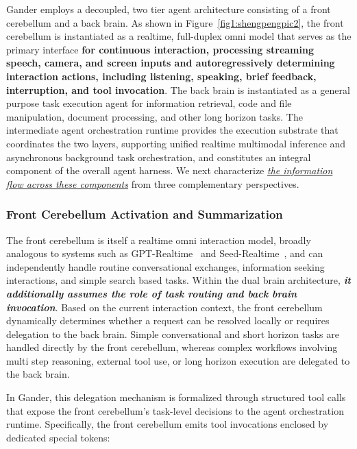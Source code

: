 Gander employs a decoupled, two tier agent architecture consisting of a front cerebellum and a back brain. As shown in Figure~\ref{fig1:shengpengpic2}, the front cerebellum is instantiated as a realtime, full-duplex omni model that serves as the primary interface \textbf{for continuous interaction, processing streaming speech, camera, and screen inputs and autoregressively determining interaction actions, including listening, speaking, brief feedback, interruption, and tool invocation}. The back brain is instantiated as a general purpose task execution agent for information retrieval, code and file manipulation, document processing, and other long horizon tasks. The intermediate agent orchestration runtime provides the execution substrate that coordinates the two layers, supporting unified realtime multimodal inference and asynchronous background task orchestration, and constitutes an integral component of the overall agent harness. We next characterize \underline{\textit{the information flow across these components}} from three complementary perspectives.


\subsubsection{Front Cerebellum Activation and Summarization}



The front cerebellum is itself a realtime omni interaction model, broadly analogous to systems such as GPT-Realtime~\cite{openai_gpt_live_system_card_2026} and Seed-Realtime~\cite{seedrealtime2026}, and can independently handle routine conversational exchanges, information seeking interactions, and simple search based tasks. Within the dual brain architecture, \textbf{\textit{it additionally assumes the role of task routing and back brain invocation}}. Based on the current interaction context, the front cerebellum dynamically determines whether a request can be resolved locally or requires delegation to the back brain. Simple conversational and short horizon tasks are handled directly by the front cerebellum, whereas complex workflows involving multi step reasoning, external tool use, or long horizon execution are delegated to the back brain.


In Gander, this delegation mechanism is formalized through structured tool calls that expose the front cerebellum's task-level decisions to the agent orchestration runtime. Specifically, the front cerebellum emits tool invocations enclosed by dedicated special tokens:

